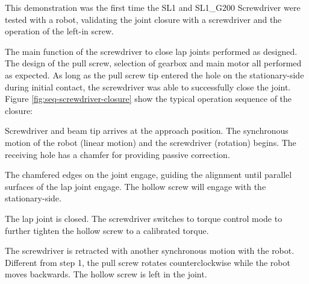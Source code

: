 This demonstration was the first time the SL1 and SL1\_G200 Screwdriver were tested with a robot, validating the joint closure with a screwdriver and the operation of the left-in screw.

The main function of the screwdriver to close lap joints performed as designed. The design of the pull screw, selection of gearbox and main motor all performed as expected. As long as the pull screw tip entered the hole on the stationary-side during initial contact, the screwdriver was able to successfully close the joint.
Figure \ref{fig:seq-screwdriver-closure} show the typical operation sequence of the closure:

\begin{description}[leftmargin=\parindent,labelindent=\parindent]
    \item [Step 1] Screwdriver and beam tip arrives at the approach position. The synchronous motion of the robot (linear motion) and the screwdriver (rotation) begins. The receiving hole has a chamfer for providing passive correction.
    \item [Step 2] The chamfered edges on the joint engage, guiding the alignment until parallel surfaces of the lap joint engage. The hollow screw will engage with the stationary-side.
    \item [Step 3] The lap joint is closed. The screwdriver switches to torque control mode to further tighten the hollow screw to a calibrated torque.
    \item [Step 4] The screwdriver is retracted with another synchronous motion with the robot. Different from step 1, the pull screw rotates counterclockwise while the robot moves backwards. The hollow screw is left in the joint.
\end{description}

